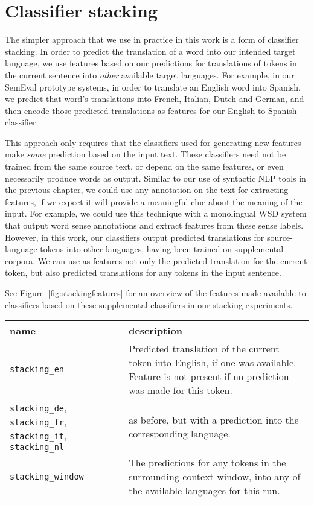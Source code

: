 \section{Classifier stacking}
The simpler approach that we use in practice in this work is a form of
classifier stacking. In order to predict the translation of a word into our
intended target language, we use features based on our predictions for
translations of tokens in the current sentence into \emph{other} available
target languages.
For example, in our SemEval prototype systems, in order to translate an
English word into Spanish, we predict that word's translations into French,
Italian, Dutch and German, and then encode those predicted translations as
features for our English to Spanish classifier.

This approach only requires that the classifiers used for generating new
features make \emph{some} prediction based on the input text. These classifiers 
need not be trained from the same source text, or depend on the same features,
or even necessarily produce words as output. Similar to our use of syntactic
NLP tools in the previous chapter, we could use any annotation on the text for
extracting features, if we expect it will provide a meaningful clue about the
meaning of the input. For example, we could use this technique with a
monolingual WSD system that output word sense annotations and extract features
from these sense labels. However, in this work, our classifiers output
predicted translations for source-language tokens into other languages, having
been trained on supplemental corpora. We can use as features not only the
predicted translation for the current token, but also predicted translations
for any tokens in the input sentence.

See Figure~\ref{fig:stackingfeatures} for an overview of the features made
available to classifiers based on these supplemental classifiers in our
stacking experiments.

\begin{figure*}
  \begin{centering}
  \begin{tabular}{|p{3.5cm}|p{11cm}|}
    \hline
    name          & description  \\
    \hline
    \texttt{stacking\_en} & Predicted translation of the current token into
    English, if one was available. Feature is not present if no prediction was
    made for this token. \\
    \hline
    \texttt{stacking\_de}, \texttt{stacking\_fr}, \texttt{stacking\_it},
    \texttt{stacking\_nl} & as before, but with a prediction into the
    corresponding language.\\
    \hline
    \texttt{stacking\_window} & The predictions for any tokens in the
    surrounding context window, into any of the available languages for this
    run. \\
    \hline
  \end{tabular}
  \end{centering}
  \caption{Classifier features based on classifier stacking, used in the
  experiments in this chapter.}
  \label{fig:stackingfeatures}
\end{figure*}

